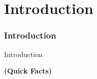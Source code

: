 %

\section{Introduction}
\begin{frame}[fragile]
	\frametitle{Introduction}

	\begin{center}\huge{Introduction}\end{center}
	\begin{center}\huge{\color{typo3darkgrey}\textbf{(Quick Facts)}}\end{center}

\end{frame}


